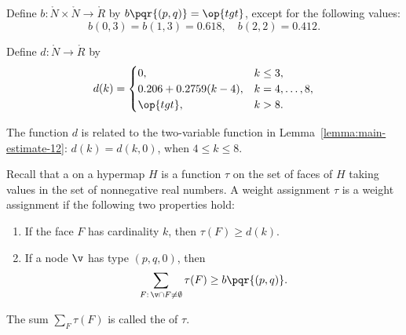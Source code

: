 \begin{definition}[b]
  Define $b:\ring{N}\times \ring{N}\to \ring{R}$ by
  $b\pqr{(p,q)}=\op{tgt}$, except for the following values:
\[
b(0,3)=b(1,3)=0.618,\quad b(2,2)=0.412.
\]
\end{definition}
%

\begin{definition}[d]
Define $d:\ring{N}\to \ring{R}$ by
\[d(k) = \begin{cases}
0, & k\le 3, \\
0.206 + 0.2759 (k-4),& k=4,\ldots,8,\\
\op{tgt},& k>8.\\
\end{cases}
\]
\end{definition}
%

The function $d$ is related to the two-variable function in
Lemma~\ref{lemma:main-estimate-12}: $d(k) = d(k,0)$, when $4\le k\le
8$.

\begin{definition}
%
  Recall that a  on a hypermap $H$ is a
  function $\tau$ on the set of faces of $H$ taking values in the set
  of nonnegative real numbers. A weight assignment $\tau$
is a 
  weight assignment if the following two properties hold:
%
\begin{enumerate}
\item If the face $F$ has cardinality $k$, then
$\tau(F) \ge d(k)$.
\item If a node $\v$ has type $(p,q,0)$, then
  \[\sum_{F:\,\v\cap F\ne\emptyset} \tau(F) \ge
    b{\pqr{(p,q)}}.\]
\end{enumerate}
The sum $\sum_F \tau(F)$ is called the  of $\tau$.
%
\end{definition}


